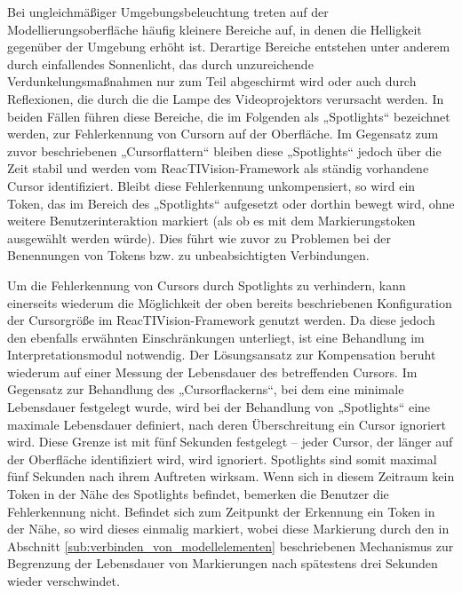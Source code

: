 Bei ungleichmäßiger Umgebungsbeleuchtung treten auf der Modellierungsoberfläche häufig kleinere Bereiche auf, in denen die Helligkeit gegenüber der Umgebung erhöht ist. Derartige Bereiche entstehen unter anderem durch einfallendes Sonnenlicht, das durch unzureichende Verdunkelungsmaßnahmen nur zum Teil abgeschirmt wird oder auch durch Reflexionen, die durch die die Lampe des Videoprojektors verursacht werden. In beiden Fällen führen diese Bereiche, die im Folgenden als „Spotlights“ bezeichnet werden, zur Fehlerkennung von Cursorn auf der Oberfläche. Im Gegensatz zum zuvor beschriebenen „Cursorflattern“ bleiben diese „Spotlights“ jedoch über die Zeit stabil und werden vom ReacTIVision-Framework als ständig vorhandene Cursor identifiziert. Bleibt diese Fehlerkennung unkompensiert, so wird ein Token, das im Bereich des „Spotlights“ aufgesetzt oder dorthin bewegt wird, ohne weitere Benutzerinteraktion markiert (als ob es mit dem Markierungstoken ausgewählt werden würde). Dies führt wie zuvor zu Problemen bei der Benennungen von Tokens bzw. zu unbeabsichtigten Verbindungen. 

Um die Fehlerkennung von Cursors durch Spotlights zu verhindern, kann einerseits wiederum die Möglichkeit der oben bereits beschriebenen Konfiguration der Cursorgröße im ReacTIVision-Framework genutzt werden. Da diese jedoch den ebenfalls erwähnten Einschränkungen unterliegt, ist eine Behandlung im Interpretationsmodul notwendig. Der Lösungsansatz zur Kompensation beruht wiederum auf einer Messung der Lebensdauer des betreffenden Cursors. Im Gegensatz zur Behandlung des „Cursorflackerns“, bei dem eine minimale Lebensdauer festgelegt wurde, wird bei der Behandlung von „Spotlights“ eine maximale Lebensdauer definiert, nach deren Überschreitung ein Cursor ignoriert wird. Diese Grenze ist mit fünf Sekunden festgelegt -- jeder Cursor, der länger auf der Oberfläche identifiziert wird, wird ignoriert. Spotlights sind somit maximal fünf Sekunden nach ihrem Auftreten wirksam. Wenn sich in diesem Zeitraum kein Token in der Nähe des Spotlights befindet, bemerken die Benutzer die Fehlerkennung nicht. Befindet sich zum Zeitpunkt der Erkennung ein Token in der Nähe, so wird dieses einmalig markiert, wobei diese Markierung durch den in Abschnitt \ref{sub:verbinden_von_modellelementen} beschriebenen Mechanismus zur Begrenzung der Lebensdauer von Markierungen nach spätestens drei Sekunden wieder verschwindet.

